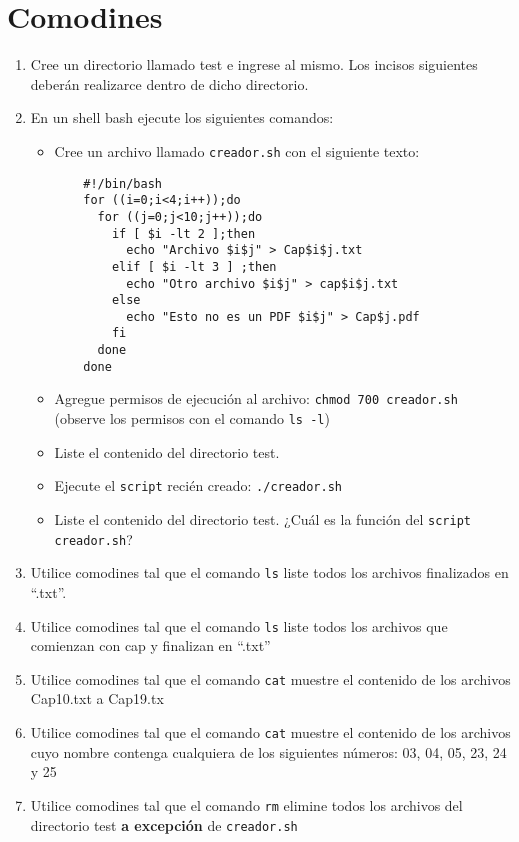 \documentclass[12pt]{article}
\begin{document}
\section*{Comodines}
\begin{enumerate}
\item Cree un directorio llamado test e ingrese al mismo. Los incisos siguientes deberán realizarce dentro de dicho directorio. 
\item En un shell bash ejecute los siguientes comandos:
	\begin{itemize}
	\item Cree un archivo llamado \texttt{creador.sh} con el siguiente texto:
	\begin{verbatim}
	#!/bin/bash
	for ((i=0;i<4;i++));do 
	  for ((j=0;j<10;j++));do 
		if [ $i -lt 2 ];then 
		  echo "Archivo $i$j" > Cap$i$j.txt
		elif [ $i -lt 3 ] ;then 
		  echo "Otro archivo $i$j" > cap$i$j.txt
		else
		  echo "Esto no es un PDF $i$j" > Cap$j.pdf
		fi
	  done 
	done
	\end{verbatim}
	\item Agregue permisos de ejecución al archivo: \texttt{chmod 700 creador.sh} (observe los permisos con el comando \texttt{ls -l})
	\item Liste el contenido del directorio test.
	\item Ejecute el \texttt{script} recién creado: \texttt{./creador.sh}
	\item Liste  el contenido del directorio test. ¿Cuál es la función del \texttt{script creador.sh}? 
 	\end{itemize}
\item Utilice comodines tal que el comando \texttt{ls} liste todos los archivos finalizados en ``.txt''.
\item Utilice comodines tal que el comando \texttt{ls} liste todos los archivos que comienzan con cap y finalizan en ``.txt''
\item Utilice comodines tal que el comando \texttt{cat} muestre el contenido de los archivos Cap10.txt a Cap19.tx
\item Utilice comodines tal que el comando \texttt{cat} muestre el contenido de los archivos cuyo nombre contenga cualquiera de los siguientes números: 03, 04, 05, 23, 24 y 25 
\item Utilice comodines tal que el comando \texttt{rm} elimine todos los archivos del directorio test \textbf{a excepción} de \texttt{creador.sh}
\end{enumerate}
\end{document}
